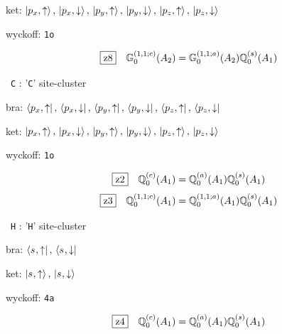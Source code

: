 \documentclass[fleqn,10pt,landscape]{jsarticle}
\begin{document}
\noindent\quad * ket: $\ket{p_{x},\uparrow},\, \ket{p_{x},\downarrow},\, \ket{p_{y},\uparrow},\, \ket{p_{y},\downarrow},\, \ket{p_{z},\uparrow},\, \ket{p_{z},\downarrow}$

\noindent\quad * wyckoff: \texttt{1o}

\begin{dmath*}
\hspace*{3mm}\fbox{z8}\quad \mathbb{G}_{0}^{(1,1;c)}(A_{2})=\mathbb{G}_{0}^{(1,1;a)}(A_{2}) \mathbb{Q}_{0}^{(s)}(A_{1})
\end{dmath*}
\vspace{5mm}

\noindent\textbullet\, \texttt{C} : '\texttt{C}' site-cluster

\noindent\quad * bra: $\bra{p_{x},\uparrow},\, \bra{p_{x},\downarrow},\, \bra{p_{y},\uparrow},\, \bra{p_{y},\downarrow},\, \bra{p_{z},\uparrow},\, \bra{p_{z},\downarrow}$

\noindent\quad * ket: $\ket{p_{x},\uparrow},\, \ket{p_{x},\downarrow},\, \ket{p_{y},\uparrow},\, \ket{p_{y},\downarrow},\, \ket{p_{z},\uparrow},\, \ket{p_{z},\downarrow}$

\noindent\quad * wyckoff: \texttt{1o}

\begin{dmath*}
\hspace*{3mm}\fbox{z2}\quad \mathbb{Q}_{0}^{(c)}(A_{1})=\mathbb{Q}_{0}^{(a)}(A_{1}) \mathbb{Q}_{0}^{(s)}(A_{1})
\end{dmath*}
\begin{dmath*}
\hspace*{3mm}\fbox{z3}\quad \mathbb{Q}_{0}^{(1,1;c)}(A_{1})=\mathbb{Q}_{0}^{(1,1;a)}(A_{1}) \mathbb{Q}_{0}^{(s)}(A_{1})
\end{dmath*}
\vspace{5mm}

\noindent\textbullet\, \texttt{H} : '\texttt{H}' site-cluster

\noindent\quad * bra: $\bra{s_{},\uparrow},\, \bra{s_{},\downarrow}$

\noindent\quad * ket: $\ket{s_{},\uparrow},\, \ket{s_{},\downarrow}$

\noindent\quad * wyckoff: \texttt{4a}

\begin{dmath*}
\hspace*{3mm}\fbox{z4}\quad \mathbb{Q}_{0}^{(c)}(A_{1})=\mathbb{Q}_{0}^{(a)}(A_{1}) \mathbb{Q}_{0}^{(s)}(A_{1})
\end{dmath*}
\vspace{5mm}
\end{document}
